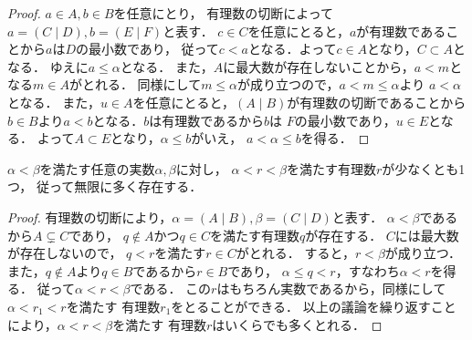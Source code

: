    \begin{proof}
      $a \in A,   b \in B$を任意にとり，
      有理数の切断によって$a = (C \mid D) ,  b= (E \mid F)$と表す．
      $c \in C$を任意にとると，$a$が有理数であることから$a$は$D$の最小数であり，
      従って$c <a$となる．よって$c \in A$となり，$C \subset A$となる．
      ゆえに$a \leq \alpha$となる．
      また，$A$に最大数が存在しないことから，$a<m$となる$m \in A$がとれる．
      同様にして$m \leq \alpha$が成り立つので，$a<m \leq \alpha$より
      $a< \alpha $となる．
      また，$u \in A$を任意にとると，$(A \mid B)$が有理数の切断であることから
      $b \in B$より$a<b$となる．$b$は有理数であるから$b$は
      $F$の最小数であり，$u \in E$となる．
      よって$A \subset E$となり，$\alpha \leq b$がいえ，
      $a < \alpha \leq b$を得る．
    \end{proof}

    \begin{thm} \label{thm:yurisutyumitu}
      $\alpha < \beta $を満たす任意の実数$\alpha ,  \beta$に対し，
      $\alpha <r< \beta$を満たす有理数$r$が少なくとも1つ，
      従って無限に多く存在する．
    \end{thm}
    \begin{proof}
      有理数の切断により，$\alpha = (A \mid B) ,  \beta = (C \mid D)$と表す．
      $\alpha < \beta$であるから$A \subsetneq C$であり，
      $q \notin A$かつ$q \in C$を満たす有理数$q$が存在する．
      $C$には最大数が存在しないので，
      $q < r$を満たす$r \in C$がとれる．
      すると，$r < \beta$が成り立つ．
      また，$q \notin A$より$q \in B$であるから$r \in B$であり，
      $\alpha \leq q<r$，すなわち$\alpha < r $を得る．
      従って$\alpha < r < \beta$である．
      この$r$はもちろん実数であるから，同様にして$\alpha < r_1<r$を満たす
      有理数$r_1$をとることができる．
      以上の議論を繰り返すことにより，$\alpha < r < \beta$を満たす
      有理数$r$はいくらでも多くとれる．
    \end{proof}


